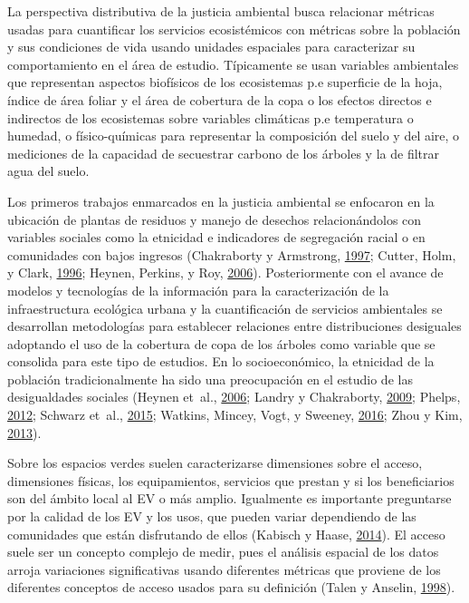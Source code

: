 \documentclass[12pt,a4paper,openany]{book}
\theoremstyle{definition}
\theoremstyle{definition}
\theoremstyle{definition}
\theoremstyle{remark}
\begin{document}
La perspectiva distributiva de la justicia ambiental busca relacionar
métricas usadas para cuantificar los servicios ecosistémicos con
métricas sobre la población y sus condiciones de vida usando unidades
espaciales para caracterizar su comportamiento en el área de estudio.
Típicamente se usan variables ambientales que representan aspectos
biofísicos de los ecosistemas p.e superficie de la hoja, índice de área
foliar y el área de cobertura de la copa o los efectos directos e
indirectos de los ecosistemas sobre variables climáticas p.e temperatura
o humedad, o físico-químicas para representar la composición del suelo y
del aire, o mediciones de la capacidad de secuestrar carbono de los
árboles y la de filtrar agua del suelo.

Los primeros trabajos enmarcados en la justicia ambiental se enfocaron
en la ubicación de plantas de residuos y manejo de desechos
relacionándolos con variables sociales como la etnicidad e indicadores
de segregación racial o en comunidades con bajos ingresos (Chakraborty y
Armstrong, \protect\hyperlink{ref-chakraborty1997exploring}{1997};
Cutter, Holm, y Clark, \protect\hyperlink{ref-cutter_role_1996}{1996};
Heynen, Perkins, y Roy,
\protect\hyperlink{ref-heynen_political_2006}{2006}). Posteriormente con
el avance de modelos y tecnologías de la información para la
caracterización de la infraestructura ecológica urbana y la
cuantificación de servicios ambientales se desarrollan metodologías para
establecer relaciones entre distribuciones desiguales adoptando el uso
de la cobertura de copa de los árboles como variable que se consolida
para este tipo de estudios. En lo socioeconómico, la etnicidad de la
población tradicionalmente ha sido una preocupación en el estudio de las
desigualdades sociales (Heynen et~al.,
\protect\hyperlink{ref-heynen_political_2006}{2006}; Landry y
Chakraborty, \protect\hyperlink{ref-landry_street_2009}{2009}; Phelps,
\protect\hyperlink{ref-phelps_association_2012}{2012}; Schwarz et~al.,
\protect\hyperlink{ref-schwarz_trees_2015}{2015}; Watkins, Mincey, Vogt,
y Sweeney, \protect\hyperlink{ref-watkins_is_2016}{2016}; Zhou y Kim,
\protect\hyperlink{ref-zhou_social_2013}{2013}).

Sobre los espacios verdes suelen caracterizarse dimensiones sobre el
acceso, dimensiones físicas, los equipamientos, servicios que prestan y
si los beneficiarios son del ámbito local al EV o más amplio. Igualmente
es importante preguntarse por la calidad de los EV y los usos, que
pueden variar dependiendo de las comunidades que están disfrutando de
ellos (Kabisch y Haase,
\protect\hyperlink{ref-kabisch_green_2014}{2014}). El acceso suele ser
un concepto complejo de medir, pues el análisis espacial de los datos
arroja variaciones significativas usando diferentes métricas que
proviene de los diferentes conceptos de acceso usados para su definición
(Talen y Anselin, \protect\hyperlink{ref-talen_assessing_1998}{1998}).
\end{document}
